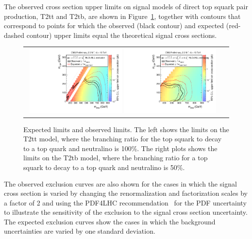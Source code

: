 The observed cross section upper limits on signal models of direct top squark pair production, T2tt and T2tb, are shown in Figure~\ref{fig:fulllimit_T2tt_T2tb}, together with contours that correspond to points for which the observed (black contour) and expected (red-dashed contour) upper limits equal the theoretical signal cross sections.
\begin{figure}[htbp]
  \begin{center}
  \begin{tabular}{cc}
\hspace{-1.5cm}
  \includegraphics[angle=0,width=0.48\textwidth]{figures/Covered_BR_1p00_Stop_OnlyXSEC.pdf}
  \includegraphics[angle=0,width=0.48\textwidth]{figures/BR_0p50_Stop_OnlyXSEC.pdf}
  \end{tabular}
  \caption{Expected limits and observed limits. The left shows the limits on the T2tt model, where the branching ratio for the top squark to decay to a top quark and neutralino is 100\%. The right plots shows the limits on the T2tb model, where the branching ratio for a top squark to decay to a top quark and neutralino is 50\%. }
    \label{fig:fulllimit_T2tt_T2tb}
  \end{center}
\end{figure}
The observed exclusion curves are also shown for the cases in which the signal cross section is varied by changing the renormalization and factorization scales by a factor of 2 and using the PDF4LHC recommendation~\cite{Botje:2011sn} for the PDF uncertainty to illustrate the sensitivity of the exclusion to the signal cross section uncertainty.
%
The expected exclusion curves show the cases in which the background uncertainties are varied by one standard deviation.


